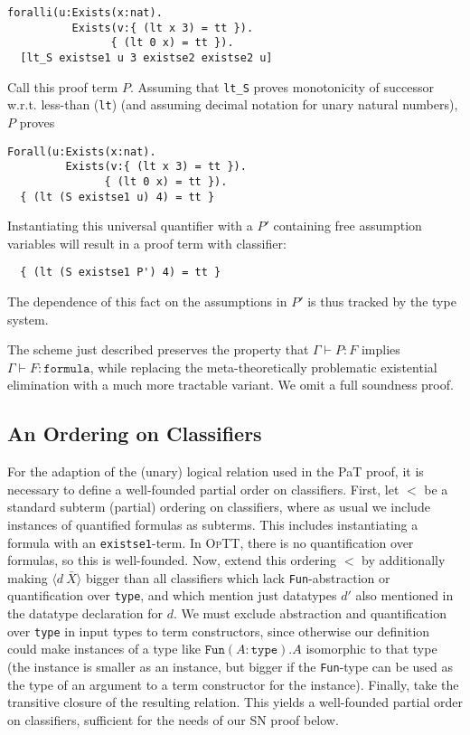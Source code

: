 \documentclass{fundam}
\newcommand{\seq}[3]{#1 \vdash #2 : #3}
\newcommand{\optt}{\textsc{OpTT}}
\begin{document}
\begin{verbatim}
foralli(u:Exists(x:nat). 
          Exists(v:{ (lt x 3) = tt }).
                { (lt 0 x) = tt }).
  [lt_S existse1 u 3 existse2 existse2 u]
\end{verbatim}

\noindent Call this proof term $P$.  Assuming that \texttt{lt\_S} proves
monotonicity of successor w.r.t. less-than (\texttt{lt}) (and assuming
decimal notation for unary natural numbers), $P$ proves

\begin{verbatim}
Forall(u:Exists(x:nat). 
         Exists(v:{ (lt x 3) = tt }).
               { (lt 0 x) = tt }).
  { (lt (S existse1 u) 4) = tt }
\end{verbatim}

\noindent Instantiating this universal quantifier with a $P'$
containing free assumption variables will result in a proof
term with classifier:

\begin{verbatim}
  { (lt (S existse1 P') 4) = tt }
\end{verbatim}

\noindent The dependence of this fact on the assumptions in $P'$
is thus tracked by the type system.  

The scheme just described preserves the property that
$\seq{\Gamma}{P}{F}$ implies $\seq{\Gamma}{F}{\texttt{formula}}$,
while replacing the meta-theoretically problematic existential
elimination with a much more tractable variant.  We omit a full
soundness proof.

\subsection{An Ordering on Classifiers}

For the adaption of the (unary) logical relation used in the PaT
proof, it is necessary to define a well-founded partial order on
classifiers.  First, let $<$ be a standard subterm (partial) ordering
on classifiers, where as usual we include instances of quantified
formulas as subterms.  This includes instantiating a formula with an
\texttt{existse1}-term.  In \optt, there is no quantification over
formulas, so this is well-founded.  Now, extend this ordering $<$ by
additionally making $\langle d\ \bar{X}\rangle$ bigger than all
classifiers which lack \texttt{Fun}-abstraction or quantification over
\texttt{type}, and which mention just datatypes $d'$ also mentioned in
the datatype declaration for $d$.  We must exclude abstraction and
quantification over \texttt{type} in input types to term constructors,
since otherwise our definition could make instances of a type like
$\texttt{Fun}(A:\texttt{type}).A$ isomorphic to that type (the
instance is smaller as an instance, but bigger if the
\texttt{Fun}-type can be used as the type of an argument to a term
constructor for the instance).  Finally, take the transitive closure
of the resulting relation.  This yields a well-founded partial order
on classifiers, sufficient for the needs of our SN proof below.
\end{document}
